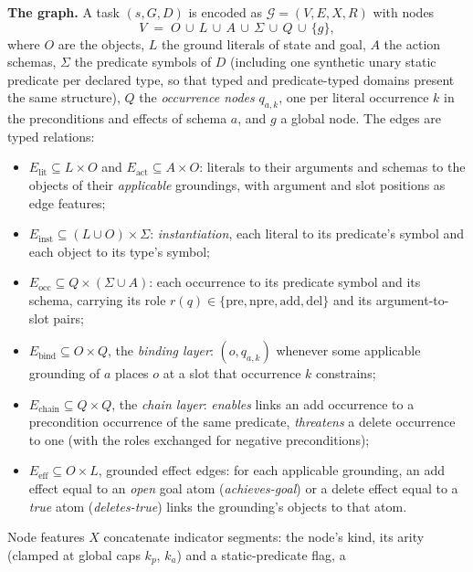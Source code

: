 \documentclass[letterpaper]{article} %
\begin{document}
\textbf{The graph.} A task $(s, G, D)$ is encoded as $\mathcal{G} = (V, E,
X, R)$ with nodes
\begin{equation*}
V \;=\; O \,\cup\, L \,\cup\, A \,\cup\, \Sigma \,\cup\, Q \,\cup\, \{g\},
\end{equation*}
where $O$ are the objects, $L$ the ground literals of state and goal, $A$
the action schemas, $\Sigma$ the predicate symbols of $D$ (including one
synthetic unary static predicate per declared type, so that typed and
predicate-typed domains present the same structure), $Q$ the
\emph{occurrence nodes} $q_{a,k}$, one per literal occurrence $k$ in the
preconditions and effects of schema $a$, and $g$ a global node. The edges
are typed relations:
\begin{itemize}
\item $E_{\mathrm{lit}} \subseteq L \times O$ and $E_{\mathrm{act}}
  \subseteq A \times O$: literals to their arguments and schemas to the
  objects of their \emph{applicable} groundings, with argument and slot
  positions as edge features;
\item $E_{\mathrm{inst}} \subseteq (L \cup O) \times \Sigma$:
  \emph{instantiation}, each literal to its predicate's symbol and each
  object to its type's symbol;
\item $E_{\mathrm{occ}} \subseteq Q \times (\Sigma \cup A)$: each occurrence
  to its predicate symbol and its schema, carrying its role
  $r(q) \in \{\mathrm{pre}, \mathrm{npre}, \mathrm{add}, \mathrm{del}\}$
  and its argument-to-slot pairs;
\item $E_{\mathrm{bind}} \subseteq O \times Q$, the \emph{binding layer}:
  $(o, q_{a,k})$ whenever some applicable grounding of $a$ places $o$ at a
  slot that occurrence $k$ constrains;
\item $E_{\mathrm{chain}} \subseteq Q \times Q$, the \emph{chain layer}:
  \textit{enables} links an add occurrence to a precondition occurrence of
  the same predicate, \textit{threatens} a delete occurrence to one (with
  the roles exchanged for negative preconditions);
\item $E_{\mathrm{eff}} \subseteq O \times L$, grounded effect edges: for
  each applicable grounding, an add effect equal to an \emph{open} goal atom
  (\textit{achieves-goal}) or a delete effect equal to a \emph{true} atom
  (\textit{deletes-true}) links the grounding's objects to that atom.
\end{itemize}
Node features $X$ concatenate indicator segments: the node's kind, its
arity (clamped at global caps $k_p$, $k_a$) and a static-predicate flag, a
\end{document}
